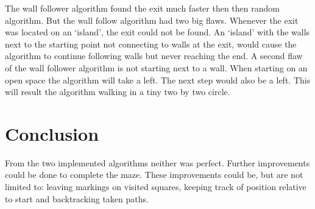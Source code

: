 \documentclass[a4paper,12pt]{article}
\begin{document}
The wall follower algorithm found the exit much faster then then random algorithm. But the wall follow algorithm had two big flaws. Whenever the exit was located on an `island', the exit could not be found. An `island' with the walls next to the starting point not connecting to walls at the exit, would cause the algorithm to continue following walls but never reaching the end. A second flaw of the wall follower algorithm is not starting next to a wall. When starting on an open space the algorithm will take a left. The next step would also be a left. This will result the algorithm walking in a tiny two by two circle.


\section{Conclusion}
From the two implemented algorithms neither was perfect. Further improvements could be done to complete the maze. These improvements could be, but are not limited to: leaving markings on visited squares, keeping track of position relative to start and backtracking taken paths.





\end{document}
